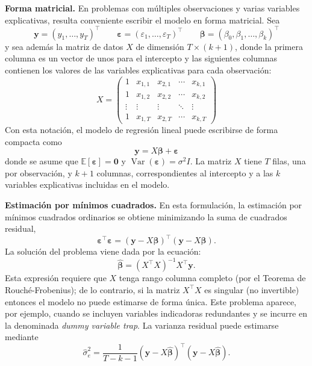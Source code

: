 \documentclass[12pt]{report} %
\begin{document}
\textbf{Forma matricial.} En problemas con múltiples observaciones y varias variables explicativas, resulta conveniente escribir el modelo en forma matricial. Sea
$$
    \mathbf{y} = (y_1, \ldots, y_T)^\top
    \qquad
    \boldsymbol{\varepsilon} = (\varepsilon_1, \ldots, \varepsilon_T)^\top
    \qquad
    \boldsymbol{\beta} = (\beta_0, \beta_1, \ldots, \beta_k)^\top
$$
y sea además la matriz de datos $X$ de dimensión $T \times (k+1)$, donde la primera columna es un vector de unos para el intercepto y las siguientes columnas contienen los valores de las variables explicativas para cada observación:
$$
    X =
    \begin{pmatrix}
        1      & x_{1,1} & x_{2,1} & \cdots & x_{k,1} \\
        1      & x_{1,2} & x_{2,2} & \cdots & x_{k,2} \\
        \vdots & \vdots  & \vdots  & \ddots & \vdots  \\
        1      & x_{1,T} & x_{2,T} & \cdots & x_{k,T}
    \end{pmatrix}
$$
Con esta notación, el modelo de regresión lineal puede escribirse de forma compacta como
\begin{equation}
    \mathbf{y} = X\boldsymbol{\beta} + \boldsymbol{\varepsilon}
    \label{eq:matrix_regression_model}
\end{equation}
donde se asume que $\mathbb{E}[\boldsymbol{\varepsilon}] = \mathbf{0}$ y $\operatorname{Var}(\boldsymbol{\varepsilon}) = \sigma^2 I$. La matriz $X$ tiene $T$ filas, una por observación, y $k+1$ columnas, correspondientes al intercepto y a las $k$ variables explicativas incluidas en el modelo.

\textbf{Estimación por mínimos cuadrados.} En esta formulación, la estimación por mínimos cuadrados ordinarios se obtiene minimizando la suma de cuadrados residual,
$$
    \boldsymbol{\varepsilon}^\top \boldsymbol{\varepsilon}
    =
    (\mathbf{y} - X\boldsymbol{\beta})^\top (\mathbf{y} - X\boldsymbol{\beta}).
$$
La solución del problema viene dada por la ecuación:
\begin{equation}
    \hat{\boldsymbol{\beta}} = (X^\top X)^{-1} X^\top \mathbf{y}.
    \label{eq:normal_equation}
\end{equation}
Esta expresión requiere que $X$ tenga rango columna completo (por el Teorema de Rouché-Frobenius); de lo contrario, si la matriz $X^\top X$ es singular (no invertible) entonces el modelo no puede estimarse de forma única. Este problema aparece, por ejemplo, cuando se incluyen variables indicadoras redundantes y se incurre en la denominada \textit{dummy variable trap}. La varianza residual puede estimarse mediante
\begin{equation}
    \hat{\sigma}_e^2 = \frac{1}{T-k-1}(\mathbf{y} - X\hat{\boldsymbol{\beta}})^\top (\mathbf{y} - X\hat{\boldsymbol{\beta}}).
    \label{eq:residual_variance_matrix}
\end{equation}
\end{document}
